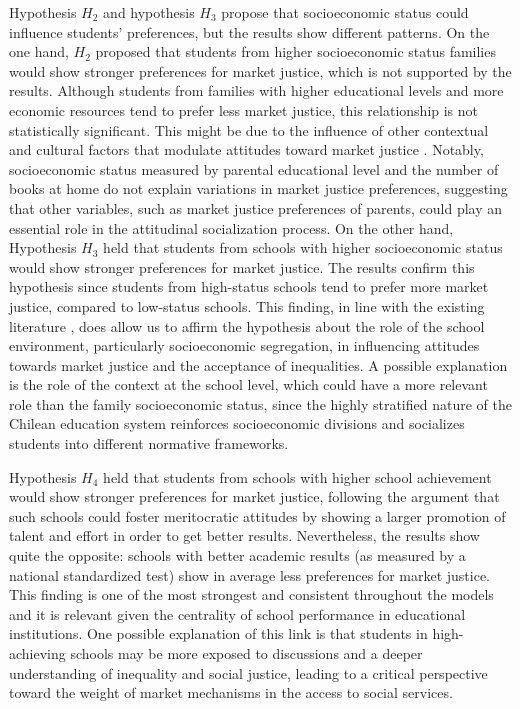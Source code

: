 \documentclass[
    behavsci,
    article,
    submit,
moreauthors
]{mdpi}
\begin{document}
Hypothesis \(H_2\) and hypothesis \(H_3\) propose that socioeconomic
status could influence students' preferences, but the results show
different patterns. On the one hand, \(H_2\) proposed that students from
higher socioeconomic status families would show stronger preferences for
market justice, which is not supported by the results. Although students
from families with higher educational levels and more economic resources
tend to prefer less market justice, this relationship is not
statistically significant. This might be due to the influence of other
contextual and cultural factors that modulate attitudes toward market
justice \citep{kohn_social_1963, kohn_class_1969, almas_fairness_2017}.
Notably, socioeconomic status measured by parental educational level and
the number of books at home do not explain variations in market justice
preferences, suggesting that other variables, such as market justice
preferences of parents, could play an essential role in the attitudinal
socialization process. On the other hand, Hypothesis \(H_3\) held that
students from schools with higher socioeconomic status would show
stronger preferences for market justice. The results confirm this
hypothesis since students from high-status schools tend to prefer more
market justice, compared to low-status schools. This finding, in line
with the existing literature
\citep{jonsson_institutional_2015, jost_attitudinal_2000}, does allow us
to affirm the hypothesis about the role of the school environment,
particularly socioeconomic segregation, in influencing attitudes towards
market justice and the acceptance of inequalities. A possible
explanation is the role of the context at the school level, which could
have a more relevant role than the family socioeconomic status, since
the highly stratified nature of the Chilean education system reinforces
socioeconomic divisions and socializes students into different normative
frameworks.

Hypothesis \(H_4\) held that students from schools with higher school
achievement would show stronger preferences for market justice,
following the argument that such schools could foster meritocratic
attitudes by showing a larger promotion of talent and effort in order to
get better results. Nevertheless, the results show quite the opposite:
schools with better academic results (as measured by a national
standardized test) show in average less preferences for market justice.
This finding is one of the most strongest and consistent throughout the
models and it is relevant given the centrality of school performance in
educational institutions. One possible explanation of this link is that
students in high-achieving schools may be more exposed to discussions
and a deeper understanding of inequality and social justice, leading to
a critical perspective toward the weight of market mechanisms in the
access to social services.
\end{document}
